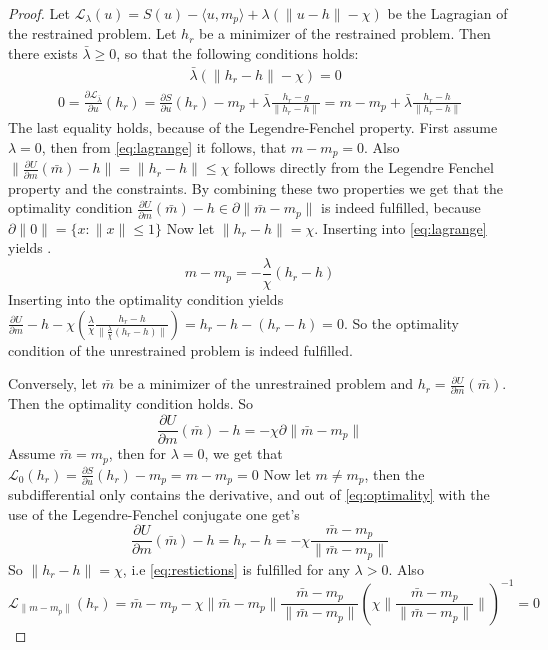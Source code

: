 \documentclass[12pt]{article}
\begin{document}
\begin{proof}
Let $\mathcal L_\lambda(u) = S(u) - \langle u,m_p \rangle + \lambda(\|u - h\| - \chi)$ be the Lagragian of the restrained problem. 
Let $h_r$ be a minimizer of the restrained problem. Then there exists $\bar \lambda \geq 0$, so that the following conditions holds:
\begin{align}\label{eq:restictions}
    &\bar \lambda (\|h_r - h\| - \chi) = 0
\end{align}
\begin{align}\label{eq:lagrange}
    0 = \frac{\partial \mathcal L_{\bar \lambda}}{\partial u}(h_r) = \frac{\partial S}{\partial u}(h_r) - m_p + \bar \lambda \frac{h_r - g}{\|h_r - h\|} = m - m_p +\bar \lambda\frac{h_r -  h}{\|h_r - h\|}
\end{align}
The last equality holds, because of the Legendre-Fenchel property. 
First assume $\lambda = 0$, then from \eqref{eq:lagrange} it follows, that $m-m_p = 0$. Also $\|\frac{\partial U}{\partial m}(\bar m) - h\| =\|h_r - h\| \leq \chi$ follows directly from the Legendre Fenchel property and the constraints. By combining these two properties we get that the optimality condition $\frac{\partial U}{\partial m}(\bar m) - h \in \partial \|\bar m - m_p\|$ is indeed fulfilled, because $\partial \|0\| = \{x \colon \|x\| \leq 1\}$
Now let $\|h_r - h\| = \chi$. Inserting into \eqref{eq:lagrange} yields .$$m - m_p = - \frac{\lambda}{\chi}(h_r - h)$$
Inserting into the optimality condition yields $\frac{\partial U}{\partial m} - h - \chi (\frac{\lambda}{\chi} \frac{h_r - h}{\|\frac{\lambda}{\chi} (h_r - h) \|}) = h_r  - h - (h_r - h) = 0$. So the optimality condition of the unrestrained problem is indeed fulfilled.

Conversely, let $\bar m$ be a minimizer of the unrestrained problem and $h_r = \frac{\partial U}{\partial m}(\bar m)$. Then the optimality condition holds. So \begin{equation}\label{eq:optimality}
    \frac{\partial U}{\partial m}(\bar m) - h = - \chi \partial\|\bar m - m_p\|
\end{equation}
Assume $\bar m = m_p$, then for $\lambda = 0$, we get that $\mathcal L_0(h_r) = \frac{\partial S}{\partial u}(h_r) - m_p = m - m_p = 0$
Now let $m \neq m_p$, then the subdifferential only contains the derivative, and out of \eqref{eq:optimality} with the use of the Legendre-Fenchel conjugate one get's \begin{equation}
   \frac{\partial U}{\partial m}(\bar m) - h = h_r - h = - \chi \frac{\bar m - m_p}{\|\bar m - m_p\|}
\end{equation}
So $\|h_r - h\| = \chi$, i.e \eqref{eq:restictions} is fulfilled for any $\lambda > 0$.  Also $$\mathcal L_{\|m - m_p\|}(h_r) =\bar m - m_p - \chi \|\bar m - m_p\|\frac{\bar m - m_p}{\|\bar m - m_p\|} (\chi \|\frac{\bar m - m_p}{\|\bar m - m_p\|}\|)^{-1} = 0$$
\end{proof}

\printbibliography
\end{document}
